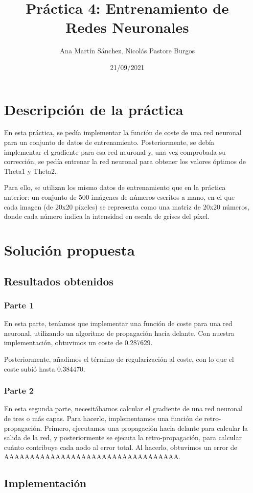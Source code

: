 \documentclass[11pt]{article}
\title{Práctica 4: Entrenamiento de Redes Neuronales}
\author{Ana Martín Sánchez, Nicolás Pastore Burgos}
\date{21/09/2021}
\begin{document}
\maketitle

\section{Descripción de la práctica}

 En esta práctica, se pedía implementar la función de coste de una red neuronal para un conjunto de datos de entrenamiento. Posteriormente, se debía implementar el gradiente para esa red neuronal y, una vez comprobada su corrección, se pedía entrenar la red neuronal para obtener los valores óptimos de Theta1 y Theta2.
 
 Para ello, se utilizan los mismo datos de entrenamiento que en la práctica anterior: un conjunto de 500 imágenes de números escritos a mano, en el que cada imagen (de 20x20 píxeles) se representa como una matriz de 20x20 números, donde cada número indica la intensidad en escala de grises del píxel.

\section{Solución propuesta}

\subsection{Resultados obtenidos}

\subsubsection {Parte 1}

 En esta parte, teníamos que implementar una función de coste para una red neuronal, utilizando un algoritmo de propagación hacia delante. Con nuestra implementación, obtuvimos un coste de 0.287629.

Posteriormente, añadimos el término de regularización al coste, con lo que el coste subió hasta 0.384470.


\subsubsection {Parte 2}

 En esta segunda parte, necesitábamos calcular el gradiente de una red neuronal de tres o más capas. Para hacerlo, implementamos una función de retro-propagación. Primero, ejecutamos una propagación hacia delante para calcular la salida de la red, y posteriormente se ejecuta la retro-propagación, para calcular cuánto contribuye cada nodo al error total. Al hacerlo, obtuvimos un error de AAAAAAAAAAAAAAAAAAAAAAAAAAAAAAAAAA.

\newpage
\subsection{Implementación}


%
\end{document}
